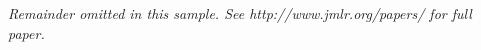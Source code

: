 \documentclass[twoside,11pt]{article}
\begin{document}
\title{}

\author{}


\maketitle

\begin{abstract}%

\end{abstract}

\begin{keywords}

\end{keywords}






{\noindent \em Remainder omitted in this sample. See http://www.jmlr.org/papers/ for full paper.}


\acks{}

\newpage

\end{document}
